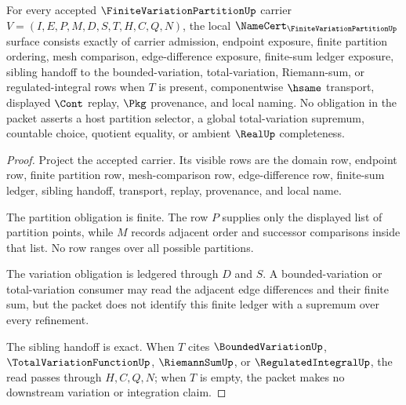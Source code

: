 \begin{theorem}
\label{thm:finite-variation-partition-namecert-obligations}
For every accepted $\FiniteVariationPartitionUp$ carrier $V=(I,E,P,M,D,S,T,H,C,Q,N)$, the local $\NameCert_{\FiniteVariationPartitionUp}$ surface consists exactly of carrier admission, endpoint exposure, finite partition ordering, mesh comparison, edge-difference exposure, finite-sum ledger exposure, sibling handoff to the bounded-variation, total-variation, Riemann-sum, or regulated-integral rows when $T$ is present, componentwise $\hsame$ transport, displayed $\Cont$ replay, $\Pkg$ provenance, and local naming. No obligation in the packet asserts a host partition selector, a global total-variation supremum, countable choice, quotient equality, or ambient $\RealUp$ completeness.
\end{theorem}
\begin{proof}
Project the accepted carrier. Its visible rows are the domain row, endpoint row, finite partition row, mesh-comparison row, edge-difference row, finite-sum ledger, sibling handoff, transport, replay, provenance, and local name.

The partition obligation is finite. The row $P$ supplies only the displayed list of partition points, while $M$ records adjacent order and successor comparisons inside that list. No row ranges over all possible partitions.

The variation obligation is ledgered through $D$ and $S$. A bounded-variation or total-variation consumer may read the adjacent edge differences and their finite sum, but the packet does not identify this finite ledger with a supremum over every refinement.

The sibling handoff is exact. When $T$ cites $\BoundedVariationUp$, $\TotalVariationFunctionUp$, $\RiemannSumUp$, or $\RegulatedIntegralUp$, the read passes through $H,C,Q,N$; when $T$ is empty, the packet makes no downstream variation or integration claim.
\end{proof}

